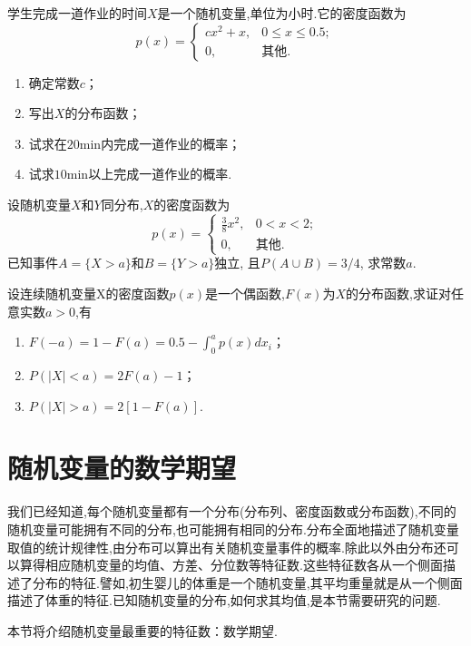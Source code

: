 \begin{xiti}
\item 学生完成一道作业的时间$ X $是一个随机变量,单位为小时.它的密度函数为
\[
  p(x) = \begin{cases}
    c x^{2}+x, & 0 \leqslant x \leqslant 0.5; \\
    0, & \text{其他}.
  \end{cases}
\]
  \begin{enumerate}
    \item 确定常数$ c $；
    \item 写出$ X $的分布函数；
    \item 试求在$ 20$min内完成一道作业的概率；
    \item 试求$ 10$min以上完成一道作业的概率.
  \end{enumerate}

\item 设随机变量$ X $和$ Y $同分布,$ X $的密度函数为
\[
  p(x) = \begin{cases}
    \frac{3}{8} x^{2}, & 0<x<2; \\
    0, & \text{其他}.
  \end{cases}
\]
已知事件$ A=\{X>a\} $和$ B=\{Y>a\} $独立, 且$P(A \cup B)=3 / 4$, 求常数$ a $.

\item 设连续随机变量X的密度函数$ p(x) $是一个偶函数,$ F(x) $为$ X $的分布函数,求证对任意实数$ a>0 $,有
  \begin{enumerate}
    \item $F(-a)=1-F(a)=0.5-\int_{0}^{a} p(x) d x_{i}$；
    \item $P( | X | <a)=2 F(a)-1$；
    \item $P(|X|>a)=2[1-F(a)]$.
  \end{enumerate}
\end{xiti}

\section{随机变量的数学期望}

我们已经知道,每个随机变量都有一个分布(分布列、密度函数或分布函数),不同的随机变量可能拥有不同的分布,也可能拥有相同的分布.分布全面地描述了随机变量取值的统计规律性,由分布可以算出有关随机变量事件的概率.除此以外由分布还可以算得相应随机变量的均值、方差、分位数等特征数.这些特征数各从一个侧面描述了分布的特征.譬如,初生婴儿的体重是一个随机变量,其平均重量就是从一个侧面描述了体重的特征.已知随机变量的分布,如何求其均值,是本节需要研究的问题.

本节将介绍随机变量最重要的特征数：数学期望.

